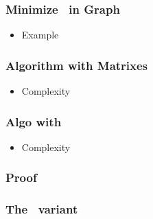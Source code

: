 \begin{frame}
  \frametitle{Minimize \ in Graph}

  \begin{itemize}
    \item Example
  \end{itemize}
  

\end{frame}

\begin{frame}
  \frametitle{Algorithm with Matrixes}

  \begin{itemize}
    \item Complexity
  \end{itemize}

\end{frame}

\begin{frame}
  \frametitle{Algo with \mdd}

  \begin{itemize}
    \item Complexity
  \end{itemize}

\end{frame}

\begin{frame}
  \frametitle{Proof}

  

\end{frame}

\begin{frame}
  \frametitle{The \alldiff\ variant}

  

\end{frame}